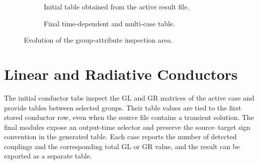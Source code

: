 \begin{figure}[!htbp]
    \centering

    \begin{subfigure}[t]{0.96\textwidth}
        \centering
        \caption{Initial table obtained from the active result file.}
        \label{fig:appendix_original_group_attributes}
    \end{subfigure}

    \vspace{0.8em}

    \begin{subfigure}[t]{0.96\textwidth}
        \centering
        \caption{Final time-dependent and multi-case table.}
        \label{fig:appendix_final_group_attributes}
    \end{subfigure}

    \caption{Evolution of the group-attribute inspection area.}
    \label{fig:appendix_group_attributes_evolution}
\end{figure}

\FloatBarrier

\section{Linear and Radiative Conductors}
\label{appsec:conductor_modules_evolution}

The initial conductor tabs inspect the GL and GR matrices of the active case
and provide tables between selected groups. Their table values are tied to the
first stored conductor row, even when the source file contains a transient
solution. The final modules expose an output-time selector and preserve the
source--target sign convention in the generated table. Each case reports the
number of detected couplings and the corresponding total GL or GR value, and
the result can be exported as a separate table.

